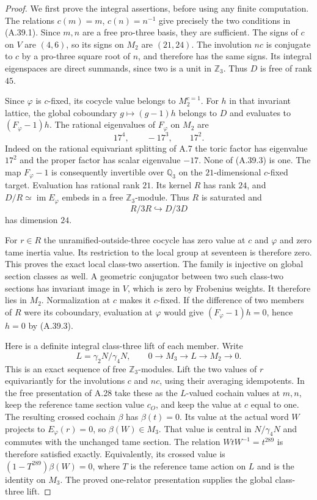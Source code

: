 \begin{proof}
We first prove the integral assertions, before using any
finite computation. The relations $c(m)=m$, $c(n)=n^{-1}$
give precisely the two conditions in (A.39.1). Since $m,n$
are a free pro-three basis, they are sufficient. The signs of
$c$ on $V$ are $(4,6)$, so its signs on $M_2$ are $(21,24)$.
The involution $nc$ is conjugate to $c$ by a pro-three square
root of $n$, and therefore has the same signs. Its integral
eigenspaces are direct summands, since two is a unit in
$\mathbb Z_3$. Thus $D$ is free of rank $45$.

Since $\varphi$ is $c$-fixed, its cocycle value belongs to
$M_2^{c=1}$. For $h$ in that invariant lattice, the global
coboundary $g\mapsto(g-1)h$ belongs to $D$ and evaluates to
$(F_\varphi-1)h$. The rational eigenvalues of $F_\varphi$ on
$M_2$ are
\[
                  17^4,\qquad -17^3,\qquad17^2.
 \tag{A.39.3}
\]
Indeed on the rational equivariant splitting of A.7 the toric
factor has eigenvalue $17^2$ and the proper factor has scalar
eigenvalue $-17$. None of (A.39.3) is one. The map
$F_\varphi-1$ is consequently invertible over $\mathbb Q_3$
on the $21$-dimensional $c$-fixed target. Evaluation has
rational rank $21$. Its kernel $R$ has rank $24$, and
$D/R\simeq\operatorname{im}E_\varphi$ embeds in a free
$\mathbb Z_3$-module. Thus $R$ is saturated and
\[
                 R/3R\hookrightarrow D/3D
 \tag{A.39.4}
\]
has dimension $24$.

For $r\in R$ the unramified-outside-three cocycle has zero
value at $c$ and $\varphi$ and zero tame inertia value. Its
restriction to the local group at seventeen is therefore zero.
This proves the exact local class-two assertion. The family
is injective on global section classes as well. A geometric
conjugator between two such class-two sections has invariant
image in $V$, which is zero by Frobenius weights. It therefore
lies in $M_2$. Normalization at $c$ makes it $c$-fixed. If the
difference of two members of $R$ were its coboundary, evaluation
at $\varphi$ would give $(F_\varphi-1)h=0$, hence $h=0$ by
(A.39.3).

Here is a definite integral class-three lift of each member.
Write
\[
 L=\gamma_2N/\gamma_4N,
 \qquad 0\longrightarrow M_3\longrightarrow L
                    \longrightarrow M_2\longrightarrow0.
 \tag{A.39.5}
\]
This is an exact sequence of free $\mathbb Z_3$-modules.
Lift the two values of $r$ equivariantly for the involutions
$c$ and $nc$, using their averaging idempotents. In the free
presentation of A.28 take these as the $L$-valued cochain
values at $m,n$, keep the reference tame section value $c_O$,
and keep the value at $c$ equal to one. The resulting crossed
cochain $\beta$ has $\beta(t)=0$. Its value at the actual
word $W$ projects to $E_\varphi(r)=0$, so $\beta(W)\in M_3$.
That value is central in $N/\gamma_4N$ and commutes with the
unchanged tame section. The relation
$WtW^{-1}=t^{289}$ is therefore satisfied exactly. Equivalently,
its crossed value is $(1-T^{289})\beta(W)=0$, where $T$
is the reference tame action on $L$ and is the identity on
$M_3$. The proved one-relator presentation supplies the global
class-three lift.


\end{proof}
